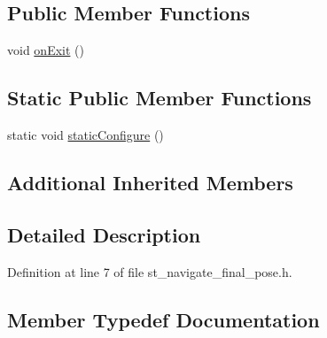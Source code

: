 \subsection*{Public Member Functions}
\begin{DoxyCompactItemize}
\item 
void \hyperlink{structsm__moveit__screw__loop_1_1StNavigateFinalPose_a1088a973aaa34ed58eb5d23a61645dc5}{on\+Exit} ()
\end{DoxyCompactItemize}
\subsection*{Static Public Member Functions}
\begin{DoxyCompactItemize}
\item 
static void \hyperlink{structsm__moveit__screw__loop_1_1StNavigateFinalPose_a71b723e8072096aa9dd95ab99857317f}{static\+Configure} ()
\end{DoxyCompactItemize}
\subsection*{Additional Inherited Members}


\subsection{Detailed Description}


Definition at line 7 of file st\+\_\+navigate\+\_\+final\+\_\+pose.\+h.



\subsection{Member Typedef Documentation}
\mbox{\label{structsm__moveit__screw__loop_1_1StNavigateFinalPose_a39c3669c37c3e9622977219a07d50b8a}} 
